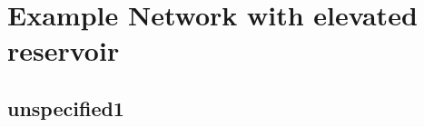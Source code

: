 \chapter{Example Network with elevated reservoir}
\label{example2}

\section{unspecified1}
\label{unspecified1}
%








